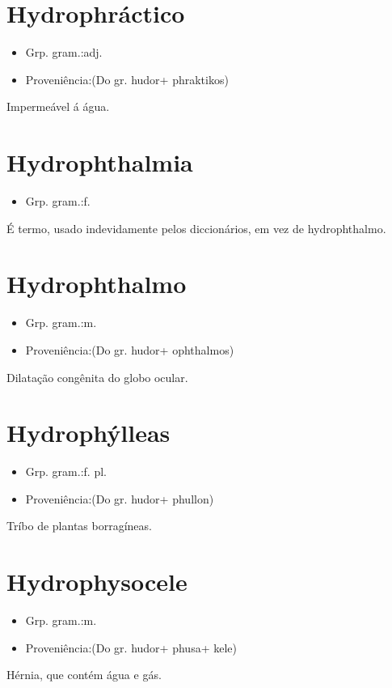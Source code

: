 \documentclass{article}
\begin{document}
\section{Hydrophráctico}
\begin{itemize}
\item {Grp. gram.:adj.}
\end{itemize}
\begin{itemize}
\item {Proveniência:(Do gr. \textunderscore hudor\textunderscore  + \textunderscore phraktikos\textunderscore )}
\end{itemize}
Impermeável á água.
\section{Hydrophthalmia}
\begin{itemize}
\item {Grp. gram.:f.}
\end{itemize}
É termo, usado indevidamente pelos diccionários, em vez de \textunderscore hydrophthalmo\textunderscore .
\section{Hydrophthalmo}
\begin{itemize}
\item {Grp. gram.:m.}
\end{itemize}
\begin{itemize}
\item {Proveniência:(Do gr. \textunderscore hudor\textunderscore  + \textunderscore ophthalmos\textunderscore )}
\end{itemize}
Dilatação congênita do globo ocular.
\section{Hydrophýlleas}
\begin{itemize}
\item {Grp. gram.:f. pl.}
\end{itemize}
\begin{itemize}
\item {Proveniência:(Do gr. \textunderscore hudor\textunderscore  + \textunderscore phullon\textunderscore )}
\end{itemize}
Tríbo de plantas borragíneas.
\section{Hydrophysocele}
\begin{itemize}
\item {Grp. gram.:m.}
\end{itemize}
\begin{itemize}
\item {Proveniência:(Do gr. \textunderscore hudor\textunderscore  + \textunderscore phusa\textunderscore  + \textunderscore kele\textunderscore )}
\end{itemize}
Hérnia, que contém água e gás.
\end{document}
